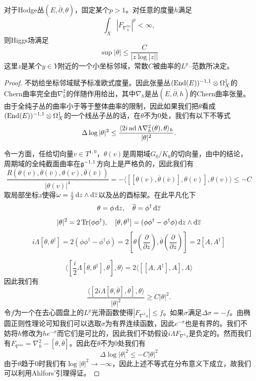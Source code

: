 \begin{lemma}\label{boundofHiggs}
    对于Hodge丛$(E,\overline{\partial},\theta)$，固定某个$p>1$。对任意的度量$h$满足
    \[
    \int_X |F_{\nabla^{hs}_{h}}|^p<\infty,
    \]
    则Higgs场满足
    \[
    \sup |\theta|\leq \frac{C}{|z\log|z||}
    \]
    这里$z$是某个$y\in Y$附近的一个小坐标邻域，常数$C$被曲率的$L^p$--范数所决定。
\end{lemma}
\begin{proof}
   不妨给坐标邻域赋予标准欧式度量。因此张量丛$(\operatorname{End}(E))^{-1,1}\otimes \Omega_X^1$的Chern曲率完全由$\nabla_h^2$的伴随作用给出，其中$\nabla_h$是丛$(E,\overline{\partial},h)$的Chern曲率张量。由于全纯子丛的曲率小于等于整体曲率的限制，因此如果我们把$\theta$看成$(\operatorname{End}(E))^{-1,1}\otimes \Omega_X^1$的一个线丛子丛的话，在$\theta$不为0处，我们有以下不等式
   \[
   \Delta \log|\theta|^2\leq \frac{\langle2i\operatorname{ad}\Lambda\nabla_h^2(\theta),\theta \rangle_h}{|\theta|^2}.
   \]

   令一方面，任给切向量$v\in T^{1,0}$，$\theta(v)$是周期域$G_0/K_0$的切向量，由\cite{griffiths1969locally}中的结论，周期域的全纯截面曲率在$\mathfrak{g}^{-1,1}$方向上是严格负的，因此我们有
\[
\frac{R(\theta(v),\overline{\theta}(\bar{v}),\theta(v),\overline{\theta}(\bar{v}))}{|\theta(v)|^4}=-\langle [[\theta(v),\overline{\theta}(\bar{v})],\theta(v)],\theta(v)\rangle\leq -C
\]
取局部坐标$z$使得$\omega=\frac{i}{2}\mathop{}\!\mathrm{d} z\wedge \mathop{}\!\mathrm{d} \overline{z}$以及丛的酉标架。在此平凡化下
\[\theta=\phi\mathop{}\!\mathrm{d} z, \quad \overline{\theta}=\phi^\dagger \mathop{}\!\mathrm{d} \overline{z}\]
\[|\theta|^2=2\operatorname{Tr}(\phi\phi^\dagger),\quad [\theta,\theta^\dagger]=(\phi\phi^\dagger-\phi^\dagger\phi)\mathop{}\!\mathrm{d} z\wedge \mathop{}\!\mathrm{d} \overline{z}\]
\[
i\Lambda[\theta,\theta^\dagger]=2(\phi\phi^\dagger-\phi^\dagger\phi)=2[\theta(\frac{\partial}{\partial z}), \overline{\theta}(\frac{\partial}{\partial \overline{z}})]=2[A,A^\dagger]\]

\[
   \langle [\frac{i}{2}\Lambda[\theta,\theta^\dagger],\theta],\theta\rangle=2\langle [[A,A^\dagger],A],A\rangle
\]
因此我们有
\[
\frac{\langle [2i\Lambda[\theta,\overline{\theta}],\theta],\theta\rangle}{|\theta|^2}\geq C|\theta|^2.
\] 
令$f$为一个在去心圆盘上的$L^p$光滑函数使得$|F_{\nabla^hs}|\leq f$。如果$\sigma$满足$\Delta\sigma=-f$。由椭圆正则性理论可知我们可以选取$\sigma$为有界连续函数，因此$e^{-\sigma}$也是有界的。我们不妨将$h$修改为$he^{-\sigma}$而它们是可比的，因此我们不妨假设$i\Lambda F_{\nabla^hs}$是负定的。然而我们有$F_{\nabla^{hs}}=\nabla_h^2-[\theta,\overline{\theta}]$。因此在$\theta$不为0处我们有
\[
\Delta\log|\theta|^2\leq -C|\theta|^2
\]
由于$\theta$趋于0时我们有$\log|\theta|^2\to -\infty$，因此上述不等式在分布意义下成立，故我们可以利用Ahlfors'引理得证。
\end{proof}
